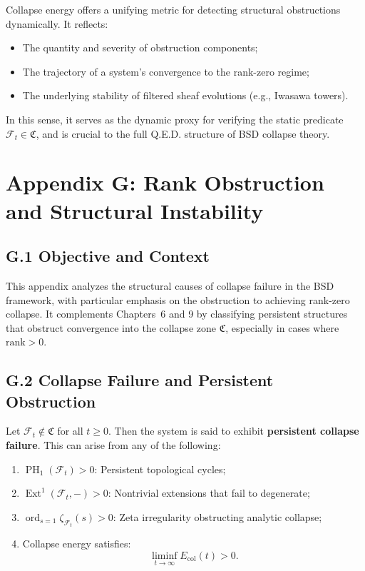\documentclass[11pt]{article}
\DeclareMathOperator{\Ext}{Ext}
\DeclareMathOperator{\PH}{PH}
\newcommand{\ord}{\operatorname{ord}}
\begin{document}
Collapse energy offers a unifying metric for detecting structural obstructions dynamically. It reflects:
\begin{itemize}
  \item The quantity and severity of obstruction components;
  \item The trajectory of a system's convergence to the rank-zero regime;
  \item The underlying stability of filtered sheaf evolutions (e.g., Iwasawa towers).
\end{itemize}

In this sense, it serves as the dynamic proxy for verifying the static predicate \( \mathcal{F}_t \in \mathfrak{C} \), and is crucial to the full Q.E.D. structure of BSD collapse theory.



\appendix
\section*{Appendix G: Rank Obstruction and Structural Instability}

\subsection*{G.1 Objective and Context}

This appendix analyzes the structural causes of collapse failure in the BSD framework, with particular emphasis on the obstruction to achieving rank-zero collapse. It complements Chapters~6 and 9 by classifying persistent structures that obstruct convergence into the collapse zone \( \mathfrak{C} \), especially in cases where \( \mathrm{rank} > 0 \).

\subsection*{G.2 Collapse Failure and Persistent Obstruction}

Let \( \mathcal{F}_t \notin \mathfrak{C} \) for all \( t \geq 0 \). Then the system is said to exhibit \textbf{persistent collapse failure}. This can arise from any of the following:

\begin{enumerate}
  \item \( \PH_1(\mathcal{F}_t) > 0 \): Persistent topological cycles;
  \item \( \Ext^1(\mathcal{F}_t, -) > 0 \): Nontrivial extensions that fail to degenerate;
  \item \( \ord_{s=1} \zeta_{\mathcal{F}_t}(s) > 0 \): Zeta irregularity obstructing analytic collapse;
  \item Collapse energy satisfies:
  \[
  \liminf_{t \to \infty} E_{\mathrm{col}}(t) > 0.
  \]
\end{enumerate}
\end{document}
